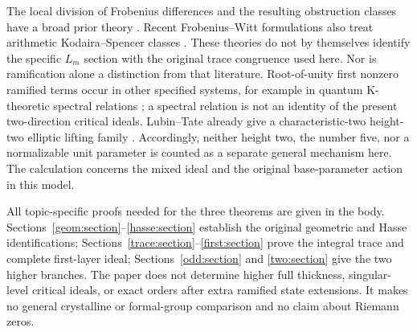 The local division of Frobenius differences and the resulting
obstruction classes have a broad prior theory
\cite{DeligneIllusie1987,DupuyZureickBrown2019,DupuyKatzRabinoffZureickBrown2019}.
Recent Frobenius--Witt formulations also treat arithmetic
Kodaira--Spencer classes \cite{Shimada2026}. These theories do not by
themselves identify the specific $L_m$ section with the original trace
congruence used here. Nor is ramification alone a distinction from
that literature. Root-of-unity first nonzero ramified terms occur in
other specified systems, for example in quantum K-theoretic spectral
relations \cite{KoroteevSmirnov2026}; a spectral relation is not an
identity of the present two-direction critical ideals.
Lubin--Tate already give a characteristic-two height-two elliptic
lifting family \cite[Section 3.5]{LubinTate1966}. Accordingly, neither
height two, the number five, nor a normalizable unit parameter is
counted as a separate general mechanism here. The calculation concerns
the mixed ideal and the original base-parameter action in this model.

All topic-specific proofs needed for the three theorems are given in
the body. Sections~\ref{geom:section}--\ref{hasse:section} establish
the original geometric and Hasse identifications;
Sections~\ref{trace:section}--\ref{first:section} prove the integral
trace and complete first-layer ideal; Sections~\ref{odd:section}
and \ref{two:section} give the two higher branches. The paper does
not determine higher full thickness, singular-level critical ideals,
or exact orders after extra ramified state extensions. It makes no
general crystalline or formal-group comparison and no claim about
Riemann zeros.
